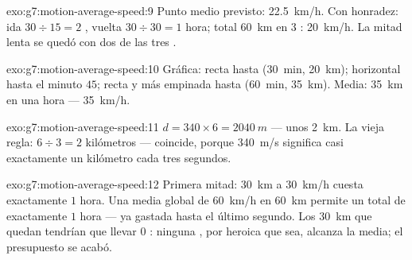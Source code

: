 \begin{solution}{exo:g7:motion-average-speed:9}
Punto medio previsto: \qty{22.5}{km/h}. Con honradez: ida $30 \div 15
= 2$ , vuelta $30 \div 30 = 1$ hora; total \qty{60}{km} en $3$
: \qty{20}{km/h}. La mitad lenta se quedó con dos de las tres
.
\end{solution}

\begin{solution}{exo:g7:motion-average-speed:10}
Gráfica: recta hasta (\qty{30}{min}, \qty{20}{km}); horizontal hasta
el minuto $45$; recta y más empinada hasta (\qty{60}{min},
\qty{35}{km}). Media: \qty{35}{km} en una hora --- \qty{35}{km/h}.
\end{solution}

\begin{solution}{exo:g7:motion-average-speed:11}
$d = 340 \times 6 = \qty{2040}{m}$ --- unos \qty{2}{km}. La vieja
regla: $6 \div 3 = 2$ kilómetros --- coincide, porque \qty{340}{m/s}
significa casi exactamente un kilómetro cada tres segundos.
\end{solution}

\begin{solution}{exo:g7:motion-average-speed:12}
Primera mitad: \qty{30}{km} a \qty{30}{km/h} cuesta exactamente $1$
hora. Una media global de \qty{60}{km/h} en \qty{60}{km} permite un
total de exactamente $1$ hora --- ya gastada hasta el último segundo.
Los \qty{30}{km} que quedan tendrían que llevar $0$ : ninguna
, por heroica que sea, alcanza la media; el presupuesto se
acabó.
\end{solution}


